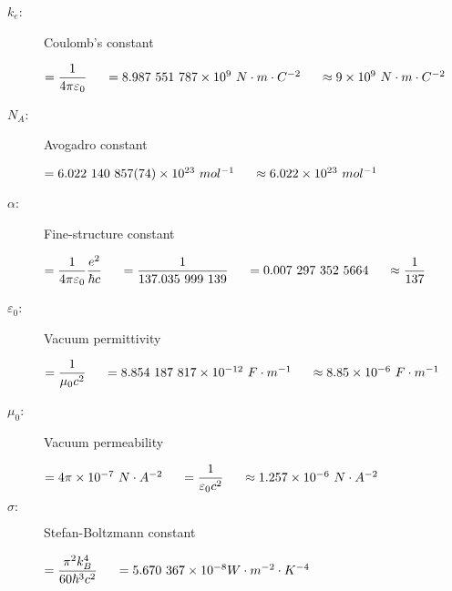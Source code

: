 \begin{description}
\item[$k_e$:] Coulomb's constant
\begin{itemize}
\items $ = \dfrac{1}{4\pi \varepsilon_0}\tab[0.5cm] = 8.987\ 551\ 787\times 10^{9} \ N\cdot m \cdot C^{-2} \tab[0.5cm] \approx 9\times 10^{9}\ N\cdot m \cdot C^{-2}$
\end{itemize}

\item[$N_A$:] Avogadro constant
\begin{itemize}
\items $ = 6.022\ 140\ 857 (74) \times 10^{23} \ mol^{-1} \tab[0.5cm] \approx 6.022 \times 10^{23} \ mol^{-1}$
\end{itemize}				

\item[$\alpha$:] Fine-structure constant
\begin{itemize}
\items $ = \dfrac{1}{4\pi\varepsilon_0}\dfrac{e^2}{\hbar c} \tab[0.5cm] = \dfrac{1}{137.035\ 999\ 139} \tab[0.5cm] = 0.007\ 297\ 352\ 5664 \tab[0.5cm] \approx \dfrac{1}{137} $
\end{itemize}		

\item[$\varepsilon_0$:] Vacuum permittivity
\begin{itemize}
\items $ = \dfrac{1}{\mu_0 c^2}\tab[0.5cm] = 8.854\ 187\ 817 \times 10^{-12} \ F \cdot m^{-1}\tab[0.5cm] \approx 8.85\times 10^{-6}\ F \cdot m^{-1}  $
\end{itemize}			

\item[$\mu_0$:] Vacuum permeability
\begin{itemize}
\items $ = 4\pi \times 10^{-7}\ N\cdot A^{-2}\tab[0.5cm] = \dfrac{1}{\varepsilon_0 c^2} \tab[0.5cm] \approx 1.257 \times 10^{-6}\ N\cdot A^{-2}  $
\end{itemize}
				
\item[$\sigma:$] Stefan-Boltzmann constant
\begin{itemize}
\items $ = \dfrac{\pi^2 k_B^4}{60\hbar^3 c^2} \tab[0.5cm] = 5.670\ 367 \times 10^{-8} W \cdot m^{-2} \cdot K^{-4} $
\end{itemize}

\end{description}

